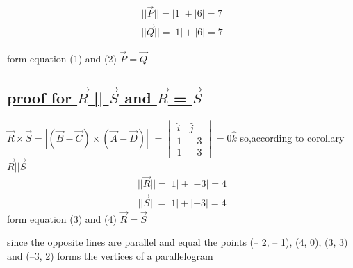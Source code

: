 \documentclass[journal,12pt,twocolumn]{IEEEtran}
\begin{document}
\boldmath
\begin{eqnarray}
||\vec{P}||=|1|+|6|=7
\end{eqnarray}
\begin{eqnarray}
||\vec{Q}||=|1|+|6|=7
\end{eqnarray}
\unboldmath

form equation (1) and (2) $\vec{P} = \vec{Q}$

\subsection{\underline{proof for  \textbf{$\vec{R}$} || \textbf{$\vec{S}$} and \textbf{$\vec{R}$} = \textbf{$\vec{S}$}}}
\boldmath
$\vec{R}\times \vec{S}=|(\vec{B}-\vec{C})\times (\vec{A}-\vec{D})|$
$ = \begin{vmatrix}
           \hat{i} & \hat{j}\\
            1 & -3\\
            1 & -3
    \end{vmatrix} = {0\hat{k}}  $
\unboldmath
\vspace{0.3cm}
so,according to corollary $\vec{R} || \vec{S}$
\boldmath
\begin{eqnarray}
||\vec{R}||=|1|+|-3|=4
\end{eqnarray}
\begin{eqnarray}
||\vec{S}||=|1|+|-3|=4
\end{eqnarray}
\unboldmath
form equation (3) and (4) $\vec{R} = \vec{S}$
\vspace{0.2cm}

since the opposite lines are parallel and equal the points (– 2, – 1), (4, 0), (3, 3) and (–3, 2) forms the vertices of a parallelogram
\end{document}
